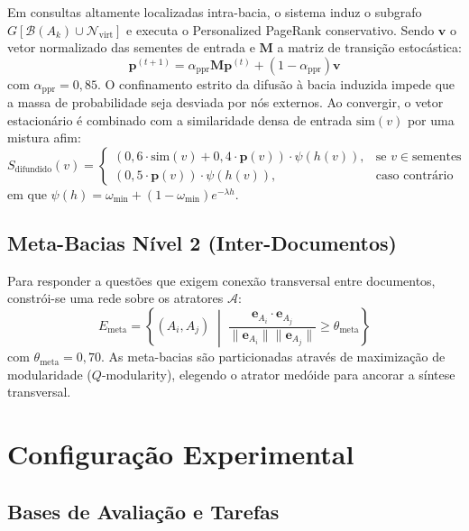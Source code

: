 \documentclass[10pt,twocolumn]{article}
\theoremstyle{definition}
\begin{document}
Em consultas altamente localizadas intra-bacia, o sistema induz o subgrafo $G[\mathcal{B}(A_k) \cup \mathcal{N}_{\text{virt}}]$ e executa o Personalized PageRank conservativo. Sendo $\mathbf{v}$ o vetor normalizado das sementes de entrada e $\mathbf{M}$ a matriz de transição estocástica:
\begin{equation}
\mathbf{p}^{(t+1)} = \alpha_{\text{ppr}} \mathbf{M} \mathbf{p}^{(t)} + (1 - \alpha_{\text{ppr}}) \mathbf{v}
\end{equation}
com $\alpha_{\text{ppr}} = 0,85$. O confinamento estrito da difusão à bacia induzida impede que a massa de probabilidade seja desviada por nós externos. Ao convergir, o vetor estacionário é combinado com a similaridade densa de entrada $\text{sim}(v)$ por uma mistura afim:
\begin{equation}
S_{\text{difundido}}(v) = \begin{cases}
(0,6 \cdot \text{sim}(v) + 0,4 \cdot \mathbf{p}(v)) \cdot \psi(h(v)), & \text{se } v \in \text{sementes} \\
(0,5 \cdot \mathbf{p}(v)) \cdot \psi(h(v)), & \text{caso contrário}
\end{cases}
\end{equation}
em que $\psi(h) = \omega_{\min} + (1 - \omega_{\min}) e^{-\lambda h}$.

\subsection{Meta-Bacias Nível 2 (Inter-Documentos)}

Para responder a questões que exigem conexão transversal entre documentos, constrói-se uma rede sobre os atratores $\mathcal{A}$:
\begin{equation}
E_{\text{meta}} = \left\{ (A_i, A_j) \;\middle|\; \frac{\mathbf{e}_{A_i} \cdot \mathbf{e}_{A_j}}{\|\mathbf{e}_{A_i}\| \|\mathbf{e}_{A_j}\|} \ge \theta_{\text{meta}} \right\}
\end{equation}
com $\theta_{\text{meta}} = 0,70$. As meta-bacias são particionadas através de maximização de modularidade ($Q$-modularity), elegendo o atrator medóide para ancorar a síntese transversal.

\section{Configuração Experimental}

\subsection{Bases de Avaliação e Tarefas}
\end{document}
